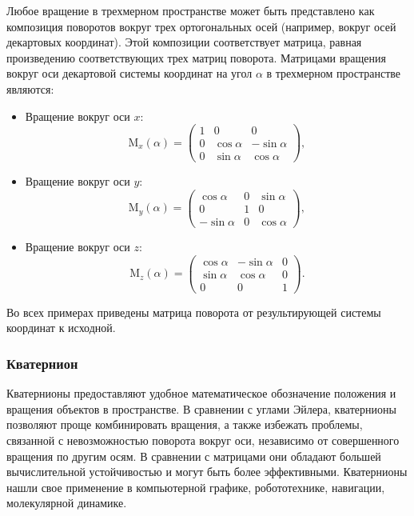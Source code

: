 Любое вращение в трехмерном пространстве может быть представлено как композиция поворотов вокруг
трех ортогональных осей (например, вокруг осей декартовых координат).
Этой композиции соответствует матрица, равная произведению соответствующих трех матриц поворота.
Матрицами вращения вокруг оси декартовой системы координат на угол $\alpha$ в трехмерном пространстве являются:
\begin{itemize}
  \item Вращение вокруг оси $x$:
  \begin{equation}
    \mathrm{M}_x(\alpha) = 
    \begin{pmatrix} 
      1 & 0          & 0 \\
      0 & \cos\alpha & -\sin\alpha \\
      0 & \sin\alpha & \cos\alpha
    \end{pmatrix},
  \end{equation}
  
  \item Вращение вокруг оси $y$:
  \begin{equation}  
    \mathrm{M}_y(\alpha) = 
    \begin{pmatrix} 
      \cos\alpha  & 0 & \sin\alpha \\
      0           & 1 & 0           \\
      -\sin\alpha & 0 & \cos\alpha
    \end{pmatrix},
  \end{equation}
  \item Вращение вокруг оси $z$:
  \begin{equation}
    \mathrm{M}_z(\alpha) = 
    \begin{pmatrix} 
      \cos\alpha & -\sin\alpha & 0 \\
      \sin\alpha & \cos\alpha  & 0 \\
      0          & 0           & 1
    \end{pmatrix}.
  \end{equation}
\end{itemize}
Во всех примерах приведены матрица поворота от результирующей системы координат к исходной.
  
\subsubsection{Кватернион}

Кватернионы\cite[11]{Kantor} предоставляют удобное математическое обозначение положения и вращения объектов в пространстве.
В сравнении с углами Эйлера, кватернионы позволяют проще комбинировать вращения\cite[17]{Altmann}, а также избежать проблемы,
связанной с невозможностью поворота вокруг оси, независимо от совершенного вращения по другим осям.
В сравнении с матрицами они обладают большей вычислительной устойчивостью и могут быть более эффективными.
Кватернионы нашли свое применение в компьютерной графике, робототехнике, навигации, молекулярной динамике.

